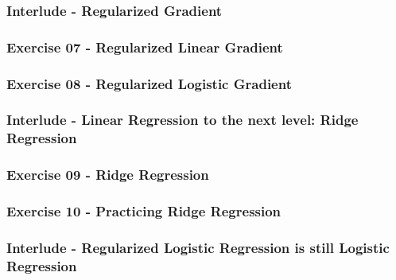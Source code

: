 \documentclass[]{article}
\begin{document}
\hypertarget{interlude---regularized-gradient}{%
\subsubsection{Interlude - Regularized
Gradient}\label{interlude---regularized-gradient}}

\hypertarget{exercise-07---regularized-linear-gradient}{%
\subsubsection{Exercise 07 - Regularized Linear
Gradient}\label{exercise-07---regularized-linear-gradient}}

\hypertarget{exercise-08---regularized-logistic-gradient}{%
\subsubsection{Exercise 08 - Regularized Logistic
Gradient}\label{exercise-08---regularized-logistic-gradient}}

\hypertarget{interlude---linear-regression-to-the-next-level-ridge-regression}{%
\subsubsection{Interlude - Linear Regression to the next level: Ridge
Regression}\label{interlude---linear-regression-to-the-next-level-ridge-regression}}

\hypertarget{exercise-09---ridge-regression}{%
\subsubsection{Exercise 09 - Ridge
Regression}\label{exercise-09---ridge-regression}}

\hypertarget{exercise-10---practicing-ridge-regression}{%
\subsubsection{Exercise 10 - Practicing Ridge
Regression}\label{exercise-10---practicing-ridge-regression}}

\hypertarget{interlude---regularized-logistic-regression-is-still-logistic-regression}{%
\subsubsection{Interlude - Regularized Logistic Regression is still
Logistic
Regression}\label{interlude---regularized-logistic-regression-is-still-logistic-regression}}
\end{document}
